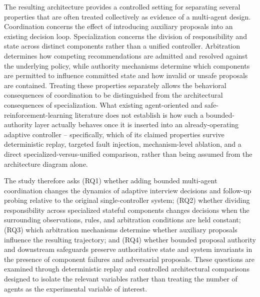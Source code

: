 \documentclass[runningheads]{llncs}
\begin{document}
The resulting architecture provides a controlled setting for separating several properties that are often treated collectively as evidence of a multi-agent design. Coordination concerns the effect of introducing auxiliary proposals into an existing decision loop. Specialization concerns the division of responsibility and state across distinct components rather than a unified controller. Arbitration determines how competing recommendations are admitted and resolved against the underlying policy, while authority mechanisms determine which components are permitted to influence committed state and how invalid or unsafe proposals are contained. Treating these properties separately allows the behavioral consequences of coordination to be distinguished from the architectural consequences of specialization. What existing agent-oriented and safe-reinforcement-learning literature does not establish is how such a bounded-authority layer actually behaves once it is inserted into an already-operating adaptive controller -- specifically, which of its claimed properties survive deterministic replay, targeted fault injection, mechanism-level ablation, and a direct specialized-versus-unified comparison, rather than being assumed from the architecture diagram alone.

The study therefore asks (RQ1) whether adding bounded multi-agent coordination changes the dynamics of adaptive interview decisions and follow-up probing relative to the original single-controller system; (RQ2) whether dividing responsibility across specialized stateful components changes decisions when the surrounding observations, rules, and arbitration conditions are held constant; (RQ3) which arbitration mechanisms determine whether auxiliary proposals influence the resulting trajectory; and (RQ4) whether bounded proposal authority and downstream safeguards preserve authoritative state and system invariants in the presence of component failures and adversarial proposals. These questions are examined through deterministic replay and controlled architectural comparisons designed to isolate the relevant variables rather than treating the number of agents as the experimental variable of interest.
\end{document}

